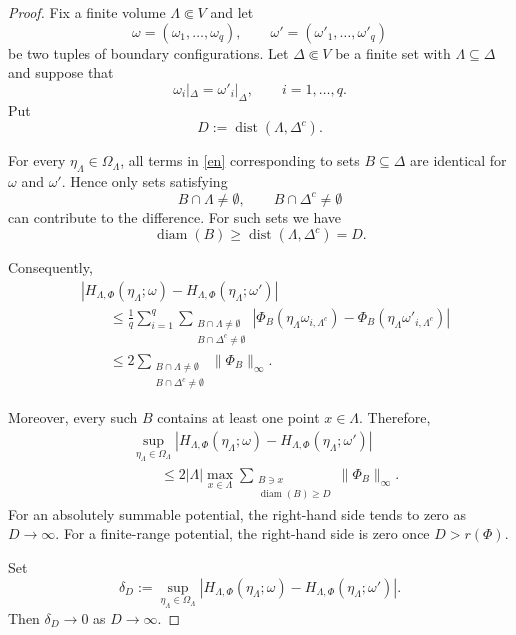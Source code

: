 \documentclass[11pt,reqno]{amsart}
\numberwithin{equation}{section} \setcounter{tocdepth}{1}
\begin{document}
\begin{proof}
	Fix a finite volume $\Lambda\Subset V$ and let
	\[
	\omega=(\omega_1,\ldots,\omega_q),
	\qquad
	\omega'=(\omega'_1,\ldots,\omega'_q)
	\]
	be two tuples of boundary configurations. Let
	$\Delta\Subset V$ be a finite set with $\Lambda\subseteq\Delta$ and
	suppose that
	\[
	\omega_i|_\Delta=\omega'_i|_\Delta,
	\qquad
	i=1,\ldots,q.
	\]
	Put
	\[
	D:=\operatorname{dist}(\Lambda,\Delta^c).
	\]
	
	For every $\eta_\Lambda\in\Omega_\Lambda$, all terms in
	\eqref{en} corresponding to sets $B\subseteq\Delta$ are identical
	for $\omega$ and $\omega'$. Hence only sets satisfying
	\[
	B\cap\Lambda\neq\emptyset,
	\qquad
	B\cap\Delta^c\neq\emptyset
	\]
	can contribute to the difference. For such sets we have 
	\[
	\operatorname{diam}(B)
	\geq
	\operatorname{dist}(\Lambda,\Delta^c)
	=
	D.
	\]
	
	
	Consequently,
	\[
	\begin{aligned}
		&\left|
		H_{\Lambda,\Phi}
		(\eta_\Lambda;\omega)
		-
		H_{\Lambda,\Phi}
		(\eta_\Lambda;\omega')
		\right|
		\\
		&\qquad\leq
		\frac{1}{q}
		\sum_{i=1}^q
		\sum_{\substack{
				B\cap\Lambda\neq\emptyset\\
				B\cap\Delta^c\neq\emptyset
		}}
		\left|
		\Phi_B(\eta_\Lambda\omega_{i,\Lambda^c})
		-
		\Phi_B(\eta_\Lambda\omega'_{i,\Lambda^c})
		\right|
		\\
		&\qquad\leq
		2
		\sum_{\substack{
				B\cap\Lambda\neq\emptyset\\
				B\cap\Delta^c\neq\emptyset
		}}
		\|\Phi_B\|_\infty.
	\end{aligned}
	\]


	Moreover, every such $B$ contains at least one point $x\in\Lambda$.
	Therefore,
	\[
	\begin{aligned}
		&\sup_{\eta_\Lambda\in\Omega_\Lambda}
		\left|
		H_{\Lambda,\Phi}
		(\eta_\Lambda;\omega)
		-
		H_{\Lambda,\Phi}
		(\eta_\Lambda;\omega')
		\right|
		\\
		&\qquad\leq
		2|\Lambda|
		\max_{x\in\Lambda}
		\sum_{\substack{
				B\ni x\\
				\operatorname{diam}(B)\geq D
		}}
		\|\Phi_B\|_\infty.
	\end{aligned}
	\]
	For an absolutely summable potential, the right-hand side tends to zero
	as $D\to\infty$. For a finite-range potential, the right-hand side is
	zero once $D>r(\Phi)$.
	
	Set
	\[
	\delta_D:=
	\sup_{\eta_\Lambda\in\Omega_\Lambda}
	\left|
	H_{\Lambda,\Phi}(\eta_\Lambda;\omega)
	-
	H_{\Lambda,\Phi}(\eta_\Lambda;\omega')
	\right|.
	\]
	Then $\delta_D\to0$ as $D\to\infty$.
	

\end{proof}
\end{document}
